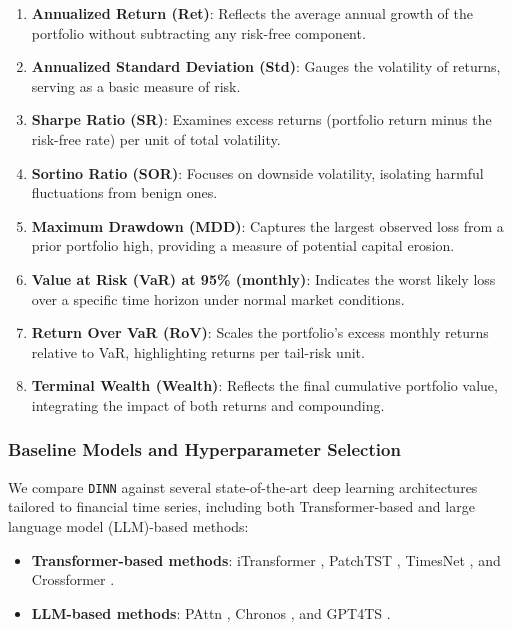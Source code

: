 \begin{enumerate}
    \item \textbf{Annualized Return (Ret)}: Reflects the average annual growth of the portfolio without subtracting any risk-free component.
    \item \textbf{Annualized Standard Deviation (Std)}: Gauges the volatility of returns, serving as a basic measure of risk.
    \item \textbf{Sharpe Ratio (SR)}: Examines excess returns (portfolio return minus the risk-free rate) per unit of total volatility.
    \item \textbf{Sortino Ratio (SOR)}: Focuses on downside volatility, isolating harmful fluctuations from benign ones.
    \item \textbf{Maximum Drawdown (MDD)}: Captures the largest observed loss from a prior portfolio high, providing a measure of potential capital erosion.
    \item \textbf{Value at Risk (VaR) at 95\% (monthly)}: Indicates the worst likely loss over a specific time horizon under normal market conditions.
    \item \textbf{Return Over VaR (RoV)}: Scales the portfolio’s excess monthly returns relative to VaR, highlighting returns per tail-risk unit.
    \item \textbf{Terminal Wealth (Wealth)}: Reflects the final cumulative portfolio value, integrating the impact of both returns and compounding.
\end{enumerate}



\subsubsection{Baseline Models and Hyperparameter Selection}
We compare \texttt{DINN} against several state-of-the-art deep learning architectures tailored to financial time series, including both Transformer-based and large language model (LLM)-based methods:

\begin{itemize}
    \item \textbf{Transformer-based methods}: iTransformer \citep{liu2023itransformer}, PatchTST \citep{Yuqietal_PatchTST}, TimesNet \citep{wu2023timesnet}, and Crossformer \citep{zhang2023crossformer}.
    \item \textbf{LLM-based methods}: PAttn \citep{tan2024language}, Chronos \citep{ansari2024chronos}, and GPT4TS \citep{zhou2023one}.
\end{itemize}

